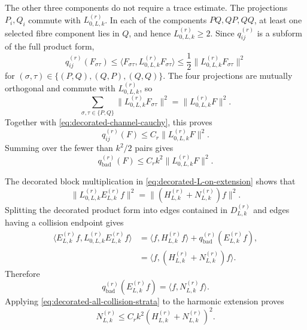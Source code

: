 \documentclass[11pt]{article}
\numberwithin{equation}{section}
\theoremstyle{remark}
\newcommand{\1}{\mathbf 1}
\begin{document}
The other three components do not require a trace estimate.  The
projections \(P_i,Q_i\) commute with \(L_{0,L,k}^{(r)}\).  In each of the
components \(PQ,QP,QQ\), at least one selected fibre component lies in
\(Q\), and hence \(L_{0,L,k}^{(r)}\geq2\).  Since \(q_{ij}^{(r)}\) is a
subform of the
full product form,
\begin{equation}
 q_{ij}^{(r)}(F_{\sigma\tau})
 \leq\langle F_{\sigma\tau},L_{0,L,k}^{(r)}F_{\sigma\tau}\rangle
 \leq\frac12\|L_{0,L,k}^{(r)}F_{\sigma\tau}\|^2
 \label{eq:decorated-optical-trace}
\end{equation}
for \((\sigma,\tau)\in\{(P,Q),(Q,P),(Q,Q)\}\).  The four projections are
mutually orthogonal and commute with \(L_{0,L,k}^{(r)}\), so
\[
 \sum_{\sigma,\tau\in\{P,Q\}}
 \|L_{0,L,k}^{(r)}F_{\sigma\tau}\|^2
 =\|L_{0,L,k}^{(r)}F\|^2.
\]
Together with \eqref{eq:decorated-channel-cauchy}, this proves
\begin{equation}
 q_{ij}^{(r)}(F)\leq C_r\|L_{0,L,k}^{(r)}F\|^2.
 \label{eq:decorated-single-pair-trace}
\end{equation}
Summing over the fewer than \(k^2/2\) pairs gives
\begin{equation}
 q_{\mathrm{bad}}^{(r)}(F)
 \leq C_rk^2\|L_{0,L,k}^{(r)}F\|^2.
 \label{eq:decorated-all-collision-strata}
\end{equation}

The decorated block multiplication in
\eqref{eq:decorated-L-on-extension} shows that
\[
 \|L_{0,L,k}^{(r)}E_{L,k}^{(r)}f\|^2
 =\|(H_{L,k}^{(r)}+N_{L,k}^{(r)})f\|^2.
\]
Splitting the decorated product form into edges contained in
\(D_{L,k}^{(r)}\) and edges having a collision endpoint gives
\begin{align*}
 \langle E_{L,k}^{(r)}f,
 L_{0,L,k}^{(r)}E_{L,k}^{(r)}f\rangle
 &=\langle f,H_{L,k}^{(r)}f\rangle
 +q_{\mathrm{bad}}^{(r)}(E_{L,k}^{(r)}f),\\
 &=\langle f,(H_{L,k}^{(r)}+N_{L,k}^{(r)})f\rangle.
\end{align*}
Therefore
\begin{equation}
 q_{\mathrm{bad}}^{(r)}(E_{L,k}^{(r)}f)
 =\langle f,N_{L,k}^{(r)}f\rangle.
 \label{eq:decorated-N-as-bad-energy}
\end{equation}
Applying \eqref{eq:decorated-all-collision-strata} to the harmonic
extension proves
\begin{equation}
 N_{L,k}^{(r)}
 \leq C_rk^2(H_{L,k}^{(r)}+N_{L,k}^{(r)})^2.
 \label{eq:decorated-quadratic-prebound}
\end{equation}
\end{document}
